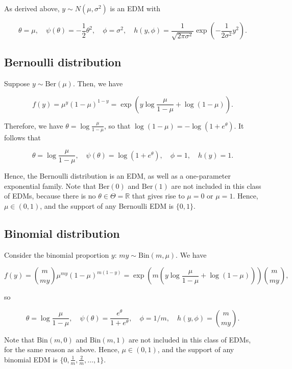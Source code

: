 \documentclass[
  11pt,
  letterpaper,
  oneside]{book}
\theoremstyle{definition}
\theoremstyle{plain}
\theoremstyle{plain}
\theoremstyle{plain}
\theoremstyle{remark}
\begin{document}
As derived above, \(y \sim N(\mu, \sigma^2)\) is an EDM with

\[
\theta = \mu, \quad \psi(\theta) = -\frac 12 \theta^2, \quad \phi = \sigma^2, \quad h(y, \phi) = \frac{1}{\sqrt{2\pi \sigma^2}}\exp\left(-\frac1{2\sigma^2} y^2\right).
\]

\hypertarget{bernoulli-distribution}{%
\subsection{Bernoulli distribution}\label{bernoulli-distribution}}

Suppose \(y \sim \text{Ber}(\mu)\). Then, we have

\[
f(y) = \mu^{y}(1-\mu)^{1-y} = \exp\left(y \log \frac{\mu}{1-\mu} + \log(1-\mu) \right).
\]

Therefore, we have \(\theta = \log \frac{\mu}{1-\mu}\), so that
\(\log(1-\mu) = -\log(1+e^\theta)\). It follows that

\[
\theta = \log \frac{\mu}{1-\mu}, \quad \psi(\theta) = \log(1+e^\theta), \quad \phi = 1, \quad h(y) = 1.
\]

Hence, the Bernoulli distribution is an EDM, as well as a one-parameter
exponential family. Note that \(\text{Ber}(0)\) and \(\text{Ber}(1)\)
are not included in this class of EDMs, because there is no
\(\theta \in \Theta = \mathbb{R}\) that gives rise to \(\mu = 0\) or
\(\mu = 1\). Hence, \(\mu \in (0,1)\), and the support of any Bernoulli
EDM is \(\{0,1\}\).

\hypertarget{binomial-distribution}{%
\subsection{Binomial distribution}\label{binomial-distribution}}

Consider the binomial proportion \(y\): \(my \sim \text{Bin}(m, \mu)\).
We have

\[
f(y) = {m \choose my}\mu^{my}(1-\mu)^{m(1-y)} = \exp\left(m\left(y \log \frac{\mu}{1-\mu} + \log(1-\mu)\right)\right){m \choose my},
\]

so

\[
\theta = \log\frac{\mu}{1-\mu}, \quad \psi(\theta) = \frac{e^{\theta}}{1 + e^{\theta}}, \quad \phi = 1/m, \quad h(y, \phi) = {m \choose my}.
\]

Note that \(\text{Bin}(m, 0)\) and \(\text{Bin}(m, 1)\) are not included
in this class of EDMs, for the same reason as above. Hence,
\(\mu \in (0,1)\), and the support of any binomial EDM is
\(\{0,\frac{1}{m}, \frac{2}{m}, \dots, 1\}\).
\end{document}
